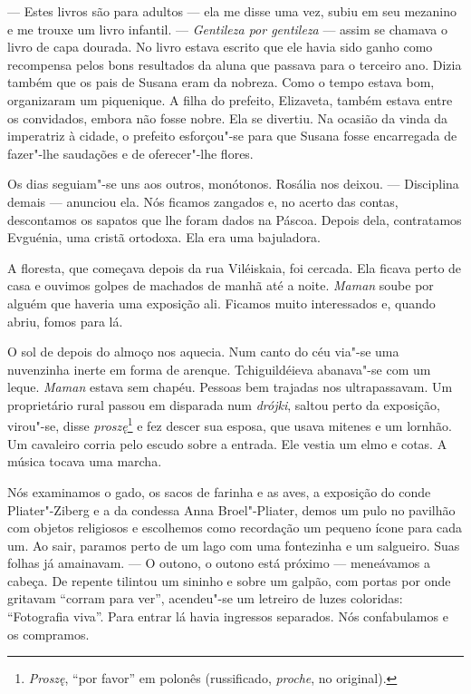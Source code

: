 --- Estes livros são para adultos --- ela me disse uma vez, subiu em seu
mezanino e me trouxe um livro infantil. --- \emph{Gentileza por
gentileza} --- assim se chamava o livro de capa dourada. No livro estava
escrito que ele havia sido ganho como recompensa pelos bons resultados
da aluna que passava para o terceiro ano. Dizia também que os pais de
Susana eram da nobreza. Como o tempo estava bom, organizaram um
piquenique. A filha do prefeito, Elizaveta, também estava entre os
convidados, embora não fosse nobre. Ela se divertiu. Na ocasião da vinda
da imperatriz à cidade, o prefeito esforçou"-se para que Susana fosse
encarregada de fazer"-lhe saudações e de oferecer"-lhe flores.

Os dias seguiam"-se uns aos outros, monótonos. Rosália nos deixou. ---
Disciplina demais --- anunciou ela. Nós ficamos zangados e, no acerto
das contas, descontamos os sapatos que lhe foram dados na Páscoa. Depois
dela, contratamos Evguénia, uma cristã ortodoxa. Ela era uma bajuladora.

A floresta, que começava depois da rua Viléiskaia, foi cercada. Ela
ficava perto de casa e ouvimos golpes de machados de manhã até a noite.
\emph{Maman} soube por alguém que haveria uma exposição ali. Ficamos
muito interessados e, quando abriu, fomos para lá.

O sol de depois do almoço nos aquecia. Num canto do céu via"-se uma
nuvenzinha inerte em forma de arenque. Tchiguildéieva abanava"-se com um
leque. \emph{Maman} estava sem chapéu. Pessoas bem trajadas nos
ultrapassavam. Um proprietário rural passou em disparada num
\emph{drójki}, saltou perto da exposição, virou"-se, disse
\emph{proszę}\footnote{\emph{Proszę}, ``por favor'' em polonês
  (russificado, \emph{proche}, no original).} e fez descer sua esposa,
que usava mitenes e um lornhão. Um cavaleiro corria pelo escudo sobre a
entrada. Ele vestia um elmo e cotas. A música tocava uma marcha.

Nós examinamos o gado, os sacos de farinha e as aves, a exposição do
conde Pliater"-Ziberg e a da condessa Anna Broel"-Pliater, demos um pulo
no pavilhão com objetos religiosos e escolhemos como recordação um
pequeno ícone para cada um. Ao sair, paramos perto de um lago com uma
fontezinha e um salgueiro. Suas folhas já amainavam. --- O outono, o
outono está próximo --- meneávamos a cabeça. De repente tilintou um
sininho e sobre um galpão, com portas por onde gritavam ``corram para
ver'', acendeu"-se um letreiro de luzes coloridas: ``Fotografia viva''.
Para entrar lá havia ingressos separados. Nós confabulamos e os
compramos.

